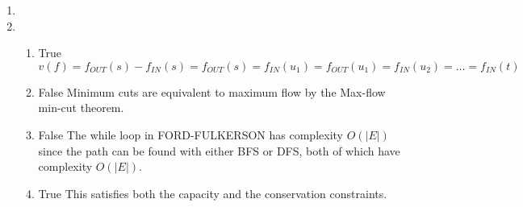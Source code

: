 \documentclass[12pt,letterpaper]{article}
\begin{document}
\begin{enumerate}
    \item
    \item
      \begin{enumerate}
        \item True
          \[
            v(f) = f_{OUT}(s) - f_{IN}(s) = f_{OUT}(s) = f_{IN}(u_1) = f_{OUT}(u_1) = f_{IN}(u_2) = \dots = f_{IN}(t)
          \]
        \item False
          Minimum cuts are equivalent to maximum flow
          by the Max-flow min-cut theorem.
        \item False
          The while loop in FORD-FULKERSON has complexity $O(|E|)$ since the path can be found with either BFS or DFS, both of which have complexity $O(|E|)$.
        \item True
          This satisfies both the capacity and the conservation constraints.
      \end{enumerate}
  \end{enumerate}
\end{document}
